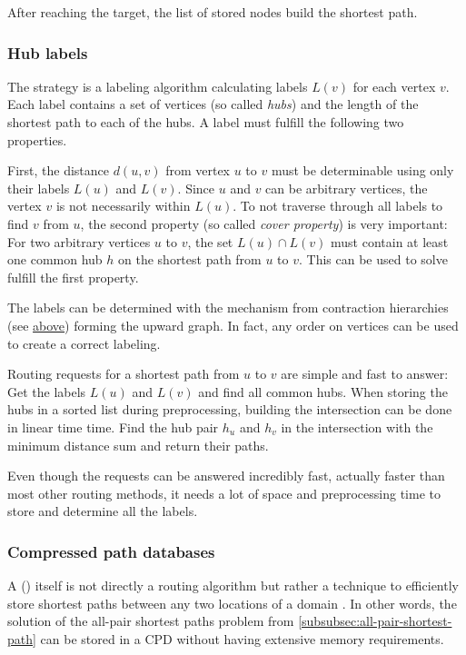 			After reaching the target, the list of stored nodes build the shortest path.
		
		\subsubsection{Hub labels}
		
			The  strategy \cite{bast-transportation-networks} is a labeling algorithm calculating labels $L(v)$ for each vertex $v$.
			Each label contains a set of vertices (so called \emph{hubs}) and the length of the shortest path to each of the hubs.
			A label must fulfill the following two properties.
			
			First, the distance $d(u, v)$ from vertex $u$ to $v$ must be determinable using only their labels $L(u)$ and $L(v)$.
			Since $u$ and $v$ can be arbitrary vertices, the vertex $v$ is not necessarily within $L(u)$.
			To not traverse through all labels to find $v$ from $u$, the second property (so called \emph{cover property}) is very important:
			For two arbitrary vertices $u$ to $v$, the set $L(u) \cap L(v)$ must contain at least one common hub $h$ on the shortest path from $u$ to $v$.
			This can be used to solve fulfill the first property.
			
			The labels can be determined with the mechanism from contraction hierarchies (see \hyperref[subsubsec:ch]{above}) forming the upward graph.
			In fact, any order on vertices can be used to create a correct labeling.

			Routing requests for a shortest path from $u$ to $v$ are simple and fast to answer:
			Get the labels $L(u)$ and $L(v)$ and find all common hubs.
			When storing the hubs in a sorted list during preprocessing, building the intersection can be done in linear time time.
			Find the hub pair $h_u$ and $h_v$ in the intersection with the minimum distance sum and return their paths.
			
			Even though the requests can be answered incredibly fast, actually faster than most other routing methods, it needs a lot of space and preprocessing time to store and determine all the labels.
		
		\subsubsection{Compressed path databases}
		
			A  () itself is not directly a routing algorithm but rather a technique to efficiently store shortest paths between any two locations of a domain \cite{botea-cpd-2013}.
			In other words, the solution of the all-pair shortest paths problem from \cref{subsubsec:all-pair-shortest-path} can be stored in a CPD without having extensive memory requirements.
			

